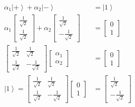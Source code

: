 \documentclass[main.tex]{subfiles}
\begin{document}
\begin{enumerate}
\begin{enumerate}
\begin{align*}
            \alpha_{1}\left|+\right\rangle+\alpha_{2}\left|-\right\rangle                                       & = \left|1\right\rangle\\
            \alpha_{1} \left[\begin{array}{l} \frac{1}{\sqrt{2}} \\ \frac{1}{\sqrt{2}} \end{array}\right]
            + \alpha_{2} \left[\begin{array}{l} \frac{1}{\sqrt{2}} \\ -\frac{1}{\sqrt{2}} \end{array}\right]    & = \left[\begin{array}{l} 0 \\ 1 \end{array}\right]\\
            \left[\begin{array}{ll} \frac{1}{\sqrt{2}} & \frac{1}{\sqrt{2}} 
            \\ \frac{1}{\sqrt{2}} & -\frac{1}{\sqrt{2}} \end{array}\right]
            \left[\begin{array}{c} \alpha_{1} \\ \alpha_{2} \end{array}\right]                                  & = \left[\begin{array}{c} 0 \\ 1 \end{array}\right] \tag{matrix is unitary, inverse is the adjoint} \\
            \left|1\right\rangle = 
            \left[\begin{array}{ll} \frac{1}{\sqrt{2}} & \frac{1}{\sqrt{2}} 
            \\ \frac{1}{\sqrt{2}} & -\frac{1}{\sqrt{2}} \end{array}\right]
            \left[\begin{array}{c} 0 \\ 1 \end{array}\right]                                                    & = \left[\begin{array}{c} \frac{1}{\sqrt{2}} \\ -\frac{1}{\sqrt{2}} \end{array}\right] \tag{new basis}\\
        \end{align*}


\end{enumerate}
\end{enumerate}
\end{document}
